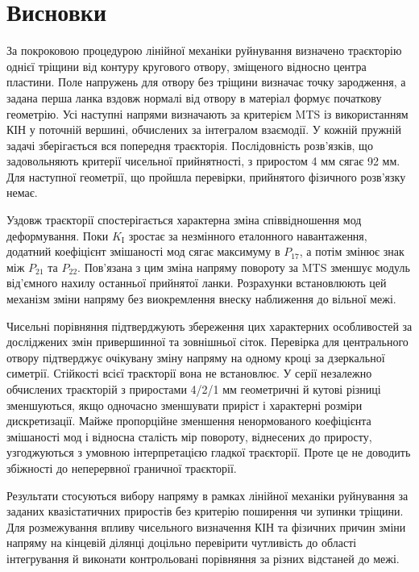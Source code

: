 \documentclass[a4paper,12pt]{article}
\begin{document}
\section{Висновки}
\label{sec:conclusions}
За покроковою процедурою лінійної механіки руйнування визначено траєкторію однієї тріщини від контуру кругового отвору, зміщеного відносно центра пластини. Поле напружень для отвору без тріщини визначає точку зародження,
а задана перша ланка вздовж нормалі від отвору в матеріал формує початкову геометрію. Усі
наступні напрями визначають за критерієм MTS із використанням КІН у поточній вершині, обчислених
за інтегралом взаємодії. У кожній пружній задачі зберігається вся попередня траєкторія. Послідовність розв’язків, що задовольняють критерії чисельної прийнятності, з приростом 4 мм сягає 92 мм. Для наступної геометрії, що пройшла перевірки,
прийнятого фізичного розв’язку немає.

Уздовж траєкторії спостерігається характерна зміна співвідношення мод деформування. Поки $K_{\mathrm{I}}$
зростає за незмінного еталонного навантаження, додатний коефіцієнт змішаності мод сягає
максимуму в $P_{17}$, а потім змінює знак між $P_{21}$ та $P_{22}$. Пов’язана з цим зміна напряму повороту за MTS
зменшує модуль від’ємного нахилу останньої прийнятої ланки. Розрахунки встановлюють цей механізм
зміни напряму без виокремлення внеску наближення до вільної межі.

Чисельні порівняння підтверджують збереження цих характерних особливостей за досліджених змін
привершинної та зовнішньої сіток. Перевірка для центрального отвору підтверджує очікувану зміну напряму на одному кроці за дзеркальної симетрії. Стійкості всієї траєкторії вона не встановлює. У
серії незалежно обчислених траєкторій з приростами 4/2/1 мм геометричні й кутові різниці
зменшуються, якщо одночасно зменшувати приріст і характерні розміри дискретизації. Майже
пропорційне зменшення ненормованого коефіцієнта змішаності мод і відносна сталість мір повороту,
віднесених до приросту, узгоджуються з умовною інтерпретацією гладкої траєкторії. Проте це не доводить збіжності до неперервної граничної траєкторії.

Результати стосуються вибору напряму в рамках лінійної механіки руйнування за заданих
квазістатичних приростів без критерію поширення чи зупинки тріщини. Для розмежування впливу
чисельного визначення КІН та фізичних причин зміни напряму на кінцевій ділянці доцільно
перевірити чутливість до області інтегрування й виконати контрольовані порівняння за різних
відстаней до межі.
\end{document}
